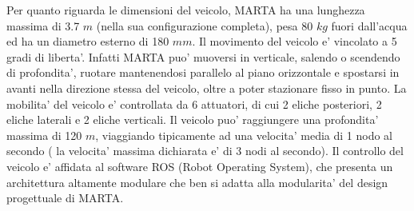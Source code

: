\documentclass[Lau,binding=0.6cm]{sapthesis}
\begin{document}
Per quanto riguarda le dimensioni del veicolo, MARTA ha una lunghezza massima di 3.7 $m$ (nella sua configurazione completa), pesa 80 $kg$ fuori dall'acqua ed  ha un diametro esterno di 180 $mm$. Il movimento del veicolo e' vincolato a 5 gradi di liberta'. Infatti MARTA puo' muoversi in verticale, salendo o scendendo di profondita', ruotare mantenendosi parallelo al piano orizzontale e spostarsi in avanti nella direzione stessa del veicolo, oltre a poter stazionare fisso in punto. La mobilita' del veicolo e' controllata da 6 attuatori, di cui 2 eliche posteriori, 2 eliche laterali e 2 eliche verticali. Il veicolo puo' raggiungere una profondita' massima di 120 $m$, viaggiando tipicamente ad una velocita' media di 1 nodo al secondo ( la velocita' massima dichiarata e' di 3 nodi al secondo). \newline 
Il controllo del veicolo e' affidata al software ROS (Robot Operating System), che presenta un architettura altamente modulare che ben si adatta alla modularita' del design progettuale di MARTA.
\end{document}
